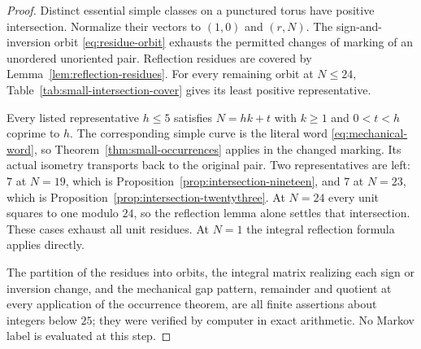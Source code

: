 \begin{proof}
Distinct essential simple classes on a punctured torus have positive intersection. Normalize their vectors to $(1,0)$ and $(r,N)$. The sign-and-inversion orbit \eqref{eq:residue-orbit} exhausts the permitted changes of marking of an unordered unoriented pair. Reflection residues are covered by Lemma~\ref{lem:reflection-residues}. For every remaining orbit at $N\leqslant24$, Table~\ref{tab:small-intersection-cover} gives its least positive representative.

Every listed representative $h\leqslant5$ satisfies $N=hk+t$ with $k\geqslant1$ and $0<t<h$ coprime to $h$. The corresponding simple curve is the literal word \eqref{eq:mechanical-word}, so Theorem~\ref{thm:small-occurrences} applies in the changed marking. Its actual isometry transports back to the original pair. Two representatives are left: $7$ at $N=19$, which is Proposition~\ref{prop:intersection-nineteen}, and $7$ at $N=23$, which is Proposition~\ref{prop:intersection-twentythree}. At $N=24$ every unit squares to one modulo $24$, so the reflection lemma alone settles that intersection. These cases exhaust all unit residues. At $N=1$ the integral reflection formula applies directly.

The partition of the residues into orbits, the integral matrix realizing each sign or inversion change, and the mechanical gap pattern, remainder and quotient at every application of the occurrence theorem, are all finite assertions about integers below $25$; they were verified by computer in exact arithmetic. No Markov label is evaluated at this step.
\end{proof}

